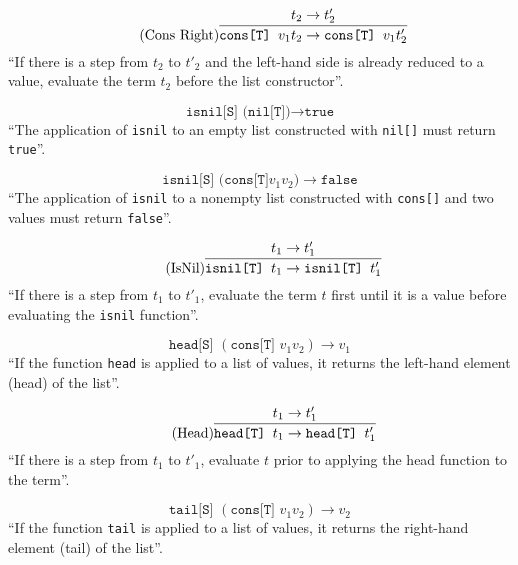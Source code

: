 \begin{equation*}
    \tag{Cons Right}
    \infer{
        \texttt{cons[T] } v_1 t_2 \rightarrow \texttt{cons[T] } v_1 t'_2
    }{
        t_2 \rightarrow t'_2
    }
\end{equation*}
``If there is a step from $t_2$ to $t'_2$ and the left-hand side
is already reduced to a value, evaluate the term $t_2$
before the list constructor''.

\begin{equation*}
    \tag{IsNil of Nil}
    \texttt{isnil[S] (nil[T])} \rightarrow \texttt{true}
\end{equation*}
``The application of \texttt{isnil} to an empty list constructed
with \texttt{nil[]} must return \texttt{true}''.

\begin{equation*}
    \tag{IsNil of Nil}
    \texttt{isnil[S] (cons[T]} v_1 v_2 \texttt{)} \rightarrow \texttt{false}
\end{equation*}
``The application of \texttt{isnil} to a nonempty list constructed
with \texttt{cons[]} and two values must return \texttt{false}''.

\begin{equation*}
    \tag{IsNil}
    \infer{
        \texttt{isnil[T] } t_1 \rightarrow \texttt{isnil[T] } t'_1
    }{
        t_1 \rightarrow t'_1
    }
\end{equation*}
``If there is a step from $t_1$ to $t'_1$, evaluate the term $t$ first
until it is a value before evaluating the \texttt{isnil} function''.

\begin{equation*}
    \tag{Head of cons}
    \texttt{head[S] } (\texttt{cons[T] } v_1 v_2) \rightarrow v_1
\end{equation*}
``If the function \texttt{head} is applied to a list of values,
it returns the left-hand element (head) of the list''.

\begin{equation*}
    \tag{Head}
    \infer{
        \texttt{head[T] } t_1 \rightarrow \texttt{head[T] } t'_1
    }{
        t_1 \rightarrow t'_1
    }
\end{equation*}
``If there is a step from $t_1$ to $t'_1$, evaluate $t$ prior to applying
the head function to the term''.

\begin{equation*}
    \tag{Tail of cons}
    \texttt{tail[S] } (\texttt{cons[T] } v_1 v_2) \rightarrow v_2
\end{equation*}
``If the function \texttt{tail} is applied to a list of values,
it returns the right-hand element (tail) of the list''.

